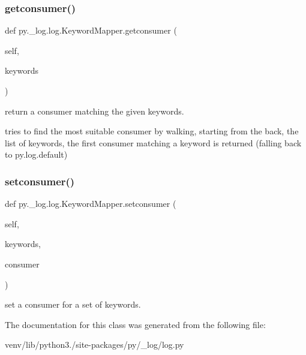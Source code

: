 \subsubsection{\texorpdfstring{getconsumer()}{getconsumer()}}
{\footnotesize\ttfamily def py.\+\_\+log.\+log.\+Keyword\+Mapper.\+getconsumer (\begin{DoxyParamCaption}\item[{}]{self,  }\item[{}]{keywords }\end{DoxyParamCaption})}

\begin{DoxyVerb}return a consumer matching the given keywords.

    tries to find the most suitable consumer by walking, starting from
    the back, the list of keywords, the first consumer matching a
    keyword is returned (falling back to py.log.default)
\end{DoxyVerb}
 \mbox{\label{classpy_1_1__log_1_1log_1_1_keyword_mapper_a048b870c1b47f5d5beede894bccb32e7}} 
\subsubsection{\texorpdfstring{setconsumer()}{setconsumer()}}
{\footnotesize\ttfamily def py.\+\_\+log.\+log.\+Keyword\+Mapper.\+setconsumer (\begin{DoxyParamCaption}\item[{}]{self,  }\item[{}]{keywords,  }\item[{}]{consumer }\end{DoxyParamCaption})}

\begin{DoxyVerb}set a consumer for a set of keywords. \end{DoxyVerb}
 

The documentation for this class was generated from the following file\+:\begin{DoxyCompactItemize}
\item 
venv/lib/python3./site-\/packages/py/\+\_\+log/log.\+py\end{DoxyCompactItemize}

